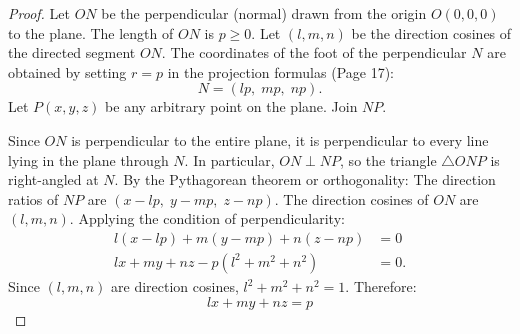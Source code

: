 \begin{proof}
Let $ON$ be the perpendicular (normal) drawn from the origin $O(0,0,0)$ to the plane.
The length of $ON$ is $p \ge 0$.
Let $(l, m, n)$ be the direction cosines of the directed segment $ON$.
The coordinates of the foot of the perpendicular $N$ are obtained by setting $r = p$ in the projection formulas (Page 17):
\begin{equation}
    N = (lp, \; mp, \; np).
\end{equation}
Let $P(x, y, z)$ be any arbitrary point on the plane. Join $NP$.

\begin{center}
\end{center}

Since $ON$ is perpendicular to the entire plane, it is perpendicular to every line lying in the plane through $N$.
In particular, $ON \perp NP$, so the triangle $\triangle ONP$ is right-angled at $N$.
By the Pythagorean theorem or orthogonality:
The direction ratios of $NP$ are $(x - lp, \; y - mp, \; z - np)$.
The direction cosines of $ON$ are $(l, m, n)$.
Applying the condition of perpendicularity:
\begin{align}
    l(x - lp) + m(y - mp) + n(z - np) &= 0 \nonumber\\
    lx + my + nz - p(l^2 + m^2 + n^2) &= 0.
\end{align}
Since $(l, m, n)$ are direction cosines, $l^2 + m^2 + n^2 = 1$. Therefore:
\begin{equation}
    \boxed{lx + my + nz = p}
\end{equation}
\end{proof}

